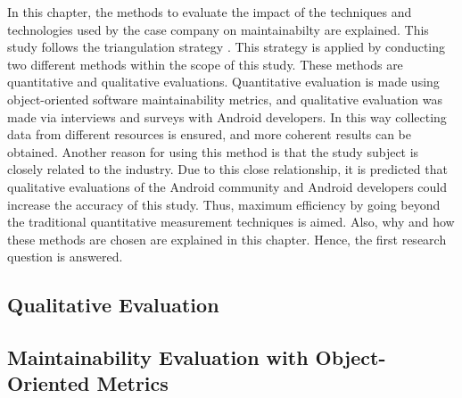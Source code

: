 In this chapter, the methods to evaluate the impact of the techniques and technologies used by the case company on maintainabilty are explained. This study follows the triangulation strategy \cite{51}. This strategy is applied by conducting two different methods within the scope of this study. These methods are quantitative and qualitative evaluations. Quantitative evaluation is made using object-oriented software maintainability metrics, and qualitative evaluation was made via interviews and surveys with Android developers. In this way collecting data from different resources is ensured, and more coherent results can be obtained. Another reason for using this method is that the study subject is closely related to the industry. Due to this close relationship, it is predicted that qualitative evaluations of the Android community and Android developers could increase the accuracy of this study. Thus, maximum efficiency by going beyond the traditional quantitative measurement techniques is aimed. Also, why and how these methods are chosen are explained in this chapter. Hence, the first research question is answered.

\subsection{Qualitative Evaluation}


\subsection{Maintainability Evaluation with Object-Oriented Metrics}
\label{section:4.2}

